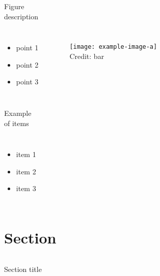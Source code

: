 \documentclass[thicklines,fleqn,xcolor=dvipsnames,compress,12pt,aspectratio=169]{beamer}
\begin{document}
\begin{frame}{Figure\\description}
    
    \begin{columns}
        \begin{itemize}
            \item point 1
            \item point 2
            \item point 3
        \end{itemize}
            \begin{figure}
                \texttt{[image: example-image-a]}\\
                {\tiny Credit: bar}
            \end{figure}
    \end{columns}
    
\end{frame}

\begin{frame}{Example\\of items}
    
    \begin{columns}
        \begin{itemize}
        \setlength\itemsep{1em}
            \item {\large item 1}
            \item {\large item 2}
            \item {\large item 3}
        \end{itemize}
    \end{columns}
    
\end{frame}


\section{Section}

\begin{frame}
    
    \begin{columns}
        
            {\Large Section title}
        
    \end{columns}
    
\end{frame}
\end{document}
